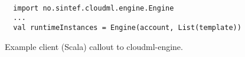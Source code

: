 \begin{figure}[tb]
  \begin{center}
    \begin{verbatim}

  import no.sintef.cloudml.engine.Engine
  ...
  val runtimeInstances = Engine(account, List(template))
    \end{verbatim}
  \end{center}
  \caption{Example client (Scala) callout to cloudml-engine.}
  \label{fig:cloudml-engine-usage}
\end{figure}

